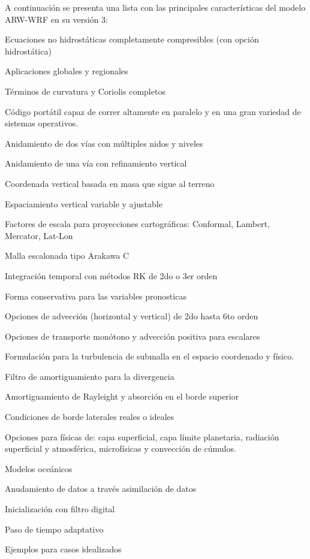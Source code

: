 A continuación se presenta una lista con las principales características del modelo ARW-WRF en su versión 3:
\begin{itemize*}
	\item Ecuaciones no hidrostáticas completamente compresibles (con opción hidrostática)
	\item Aplicaciones globales y regionales
	\item Términos de curvatura y Coriolis completos
	\item Código portátil capaz de correr altamente en paralelo y en una gran variedad de sistemas operativos.
	\item Anidamiento de dos vías con múltiples nidos y niveles
	\item Anidamiento de una vía con refinamiento vertical
	\item Coordenada vertical basada en masa que sigue al terreno
	\item Espaciamiento vertical variable y ajustable
	\item Factores de escala para proyecciones cartográficas: Conformal, Lambert, Mercator, Lat-Lon
	\item Malla escalonada tipo Arakawa C
	\item Integración temporal con métodos RK de 2do o 3er orden
	\item Forma conservativa para las variables pronosticas
	\item Opciones de advección (horizontal y vertical) de 2do hasta 6to orden
	\item Opciones de transporte monótono y advección positiva para escalares
	\item Formulación para la turbulencia de submalla en el espacio coordenado y físico.
	\item Filtro de amortiguamiento para la divergencia
	\item Amortiguamiento de Rayleight y absorción en el borde superior
	\item Condiciones de borde laterales reales o ideales
	\item Opciones para físicas de: capa superficial, capa límite planetaria, radiación superficial y atmosférica, microfísicas y convección de cúmulos.
	\item Modelos oceánicos
	\item Anudamiento de datos a través asimilación de datos
	\item Inicialización con filtro digital
	\item Paso de tiempo adaptativo
	\item Ejemplos para casos idealizados
\end{itemize*}

